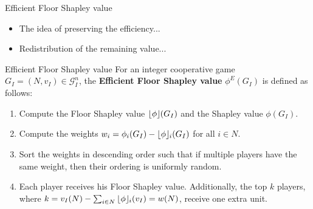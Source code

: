 \documentclass{beamer}
\newcommand{\floor}[1]{\left\lfloor #1 \right\rfloor}
\newcommand{\floorphi}{\ensuremath{\floor{\phi}\hspace{-0.5ex}}}
\begin{document}
\begin{frame}{Efficient Floor Shapley value}
    \pause
    \begin{itemize}
        \item The idea of preserving the efficiency...
        \pause
        \item Redistribution of the remaining value...
    \end{itemize}

    \pause

    \begin{block}{Efficient Floor Shapley value}
        For an integer cooperative game $G_I=(N,v_I) \in \mathcal{G}_I^n$, the \textbf{Efficient Floor Shapley value} $\phi^E(G_I)$ is defined as follows:
        \begin{enumerate}
            \item Compute the Floor Shapley value $\floorphi(G_I)$ and the Shapley value $\phi(G_I)$.
            \item Compute the weights $w_i = \phi_i(G_I) - \floorphi_i(G_I)$ for all $i \in N$.
            \item Sort the weights in descending order such that if multiple players have the same weight, then their ordering is uniformly random.
            \item Each player receives his Floor Shapley value. Additionally, the top $k$ players, where $k = v_I(N) - \sum_{i \in N} \floorphi_i(v_I) = w(N)$, receive one extra unit.
        \end{enumerate}
    \end{block}
\end{frame}


\end{document}
